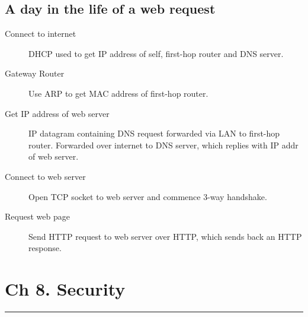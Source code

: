 \documentclass{article}
\begin{document}
\subsection*{A day in the life of a web request}

\begin{description}
    \item[Connect to internet] DHCP used to get IP address of self, first-hop router and DNS server.
    \item[Gateway Router] Use ARP to get MAC address of first-hop router.
    \item[Get IP address of web server] IP datagram containing DNS request forwarded via LAN to first-hop 
    router. Forwarded over internet to DNS server, which replies with IP addr of web server.
    \item[Connect to web server] Open TCP socket to web server and commence 3-way handshake.
    \item[Request web page] Send HTTP request to web server over HTTP, which sends back an HTTP response.
\end{description}

\newpage

\section*{Ch 8. Security}
\noindent
\rule{\linewidth}{0.5mm}
\noindent
\end{document}
